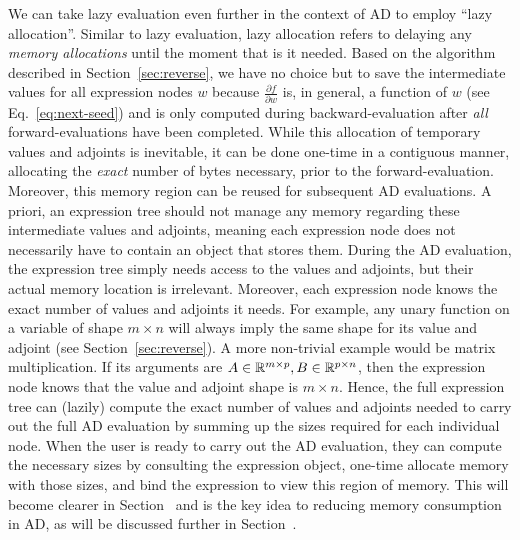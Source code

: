We can take lazy evaluation even further in the context of AD to employ ``lazy allocation''.
Similar to lazy evaluation, lazy allocation refers to delaying any \emph{memory allocations} until the moment that is it needed.
Based on the algorithm described in Section~\ref{sec:reverse},
we have no choice but to save the intermediate values for all expression nodes $w$
because $\frac{\partial f}{\partial w}$ is, in general, a function of $w$ (see Eq.~\ref{eq:next-seed})
and is only computed during backward-evaluation after \emph{all} forward-evaluations have been completed.
While this allocation of temporary values and adjoints is inevitable,
it can be done one-time in a contiguous manner, allocating the \emph{exact} number of bytes necessary,
prior to the forward-evaluation.
Moreover, this memory region can be reused for subsequent AD evaluations.
A priori, an expression tree should not manage any memory regarding these intermediate values and adjoints,
meaning each expression node does not necessarily have to contain an object that stores them.
During the AD evaluation, the expression tree simply needs access to 
the values and adjoints, but their actual memory location is irrelevant.
Moreover, each expression node knows the exact number of values and adjoints it needs.
For example, any unary function on a variable of shape $m \times n$ 
will always imply the same shape for its value and adjoint (see Section~\ref{sec:reverse}).
A more non-trivial example would be matrix multiplication.
If its arguments are $A \in \mathbb{R}^{m \times p}, B \in \mathbb{R}^{p \times n}$, then
the expression node knows that the value and adjoint shape is $m \times n$.
Hence, the full expression tree can (lazily) compute the exact number of values and adjoints
needed to carry out the full AD evaluation by summing up the sizes required for each individual node.
When the user is ready to carry out the AD evaluation, 
they can compute the necessary sizes by consulting the expression object,
one-time allocate memory with those sizes, and
bind the expression to view this region of memory.
This will become clearer in Section~
and is the key idea to reducing memory consumption in AD, 
as will be discussed further in Section~.\@

